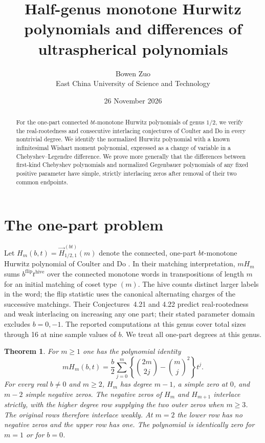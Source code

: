 \documentclass[11pt]{article}
\title{Half-genus monotone Hurwitz polynomials and differences of ultraspherical polynomials}
\author{Bowen Zuo\\{\small East China University of Science and Technology}}
\date{26 November 2026}
\newtheorem{theorem}{Theorem}
\begin{document}
\maketitle
\begin{abstract}
For the one-part connected $bt$-monotone Hurwitz polynomials of genus $1/2$, we verify the real-rootedness and consecutive interlacing conjectures of Coulter and Do in every nontrivial degree. We identify the normalized Hurwitz polynomial with a known infinitesimal Wishart moment polynomial, expressed as a change of variable in a Chebyshev--Legendre difference. We prove more generally that the differences between first-kind Chebyshev polynomials and normalized Gegenbauer polynomials of any fixed positive parameter have simple, strictly interlacing zeros after removal of their two common endpoints.
\end{abstract}

\section{The one-part problem}
Let $H_m(b,t)=\vec H_{1/2,1}^{(bt)}(m)$ denote the connected, one-part $bt$-monotone Hurwitz polynomial of Coulter and Do \cite[Cor.~4.16, Prop.~4.18]{cd}. In their matching interpretation, $mH_m$ sums $b^{\mathrm{flip}}t^{\mathrm{hive}}$ over the connected monotone words in transpositions of length $m$ for an initial matching of coset type $(m)$. The hive counts distinct larger labels in the word; the flip statistic uses the canonical alternating charges of the successive matchings. Their Conjectures~4.21 and 4.22 predict real-rootedness and weak interlacing on increasing any one part; their stated parameter domain excludes $b=0,-1$. The reported computations at this genus cover total sizes through 16 at nine sample values of $b$. We treat all one-part degrees at this genus.

\begin{theorem}\label{H}
For $m\ge1$ one has the polynomial identity
\[
 mH_m(b,t)=\frac b2\sum_{j=0}^m
       \left\{\binom{2m}{2j}-\binom mj^2\right\}t^j.
\]
For every real $b\ne0$ and $m\ge2$, $H_m$ has degree $m-1$, a simple zero at $0$, and $m-2$ simple negative zeros. The negative zeros of $H_m$ and $H_{m+1}$ interlace strictly, with the higher degree row supplying the two outer zeros when $m\ge3$. The original rows therefore interlace weakly. At $m=2$ the lower row has no negative zeros and the upper row has one. The polynomial is identically zero for $m=1$ or for $b=0$.
\end{theorem}
\end{document}
